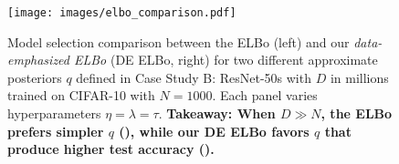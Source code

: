 \begin{figure}[t!]
  \centering
  \texttt{[image: images/elbo\_comparison.pdf]}
  \caption{Model selection comparison between the ELBo (left) and our \emph{data-emphasized ELBo} (DE ELBo, right) for two different approximate posteriors $q$ defined in Case Study B: ResNet-50s with $D$ in millions trained on CIFAR-10 with $N=1000$. Each panel varies hyperparameters $\eta = \lambda = \tau$.
  \textbf{Takeaway: When $D \gg N$, the ELBo prefers simpler $q$ (), while our DE ELBo favors $q$ that produce higher test accuracy ().}}
  \label{fig:elbo_comparison}
\end{figure}